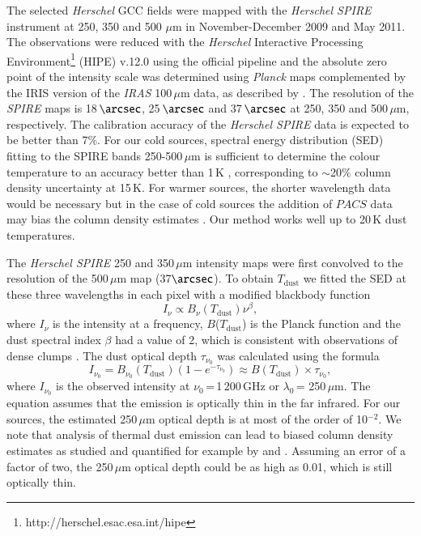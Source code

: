 \documentclass[printer]{aa}
\begin{document}
The selected \textit{Herschel} GCC fields were mapped with the \textit{Herschel SPIRE} instrument at 250, 350 and 500 $\mu$m in November-December 2009 and May 2011. The observations were reduced with the \textit{Herschel} Interactive Processing Environment\footnote{http://herschel.esac.esa.int/hipe} (HIPE) v.12.0 using the official pipeline and the absolute zero point of the intensity scale was determined using \textit{Planck} maps complemented by the IRIS version of the \textit{IRAS} 100\,$\mu$m data, as described by \citet{juvela2012}.
The resolution of the \textit{SPIRE} maps is 18\,$\arcsec$, 25\,$\arcsec$ and 37\,$\arcsec$ at 250, 350 and 500\,$\mu$m, respectively. The calibration accuracy of the \textit{Herschel SPIRE} data is expected to be better than 7\%. For our cold sources, spectral energy distribution (SED) fitting to the SPIRE bands 250-500\,$\mu$m is sufficient to determine the colour temperature to an accuracy better than 1\,K \citep{juvela2012}, corresponding to $\sim$20\% column density
uncertainty at 15\,K. For warmer sources, the shorter wavelength data would be necessary but in the case of cold sources the addition of $PACS$ data may bias the column density estimates \citep{shetty2009a, shetty2009b, malinen2011,juvela2013}. Our method works well up to 20\,K dust temperatures.

The \textit{Herschel SPIRE} 250 and 350\,$\mu$m intensity maps were first convolved to the resolution of the 500\,$\mu$m map (37$\arcsec$). To obtain $T\mathrm{_{dust}}$ we fitted the SED at these three wavelengths in each pixel with a modified blackbody function
\begin{equation}
I_{\nu} \propto B_{\nu}(T\mathrm{_{dust}})\nu^{\beta},
\end{equation}
where $I_{\nu}$ is the intensity at a frequency, $B$($T\mathrm{_{dust}}$) is the Planck function and the dust spectral index $\beta$ had a value of 2, which is consistent with observations of dense clumps \citep{juvela2015b, juvela2015a}. The dust optical depth $\tau_{\nu_0}$ was calculated using the formula
\begin{equation}
I_{\nu_0}=B_{\nu_0}(T\mathrm{_{dust}})(1-e^{-\tau_{\nu_0}}) \approx B(T\mathrm{_{dust}})\times\tau_{\nu_0},
\end{equation}
where $I_{\nu_0}$ is the observed intensity at $\nu_0$\,=\,1\,200\,GHz or $\lambda_0$\,= 250\,$\mu$m. The equation assumes that the emission is optically thin in the far infrared. For our sources, the estimated 250\,$\mu$m optical depth is at most of the order of 10$^{-2}$. We note that analysis of thermal dust emission can lead to biased column density estimates as studied and quantified for example by \citet{malinen2011, juvela2013, juvela2015a, pagani2015} and \citet{steinacker2016}. Assuming an error of a factor of two, the 250\,$\mu$m optical depth could be as high as 0.01, which is still optically thin.
\end{document}

